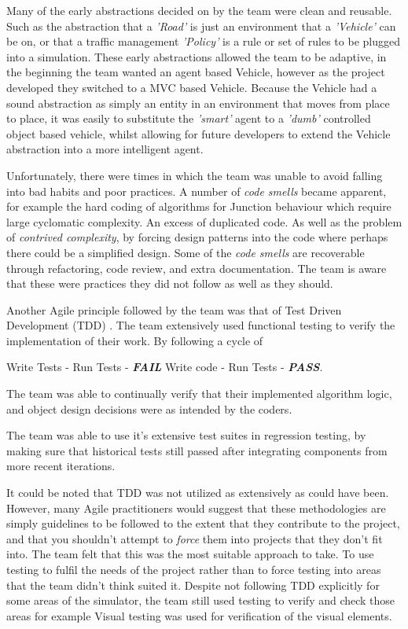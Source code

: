 \documentclass[11pt]{article}
\begin{document}
{\begin{enumerate}
	Many of the early abstractions decided on by the team were clean and reusable. Such as the abstraction that a \textit{'Road'} is just an environment that a \textit{'Vehicle'} can be on, or that a traffic management \textit{'Policy'} is a rule or set of rules to be plugged into a simulation. These early abstractions allowed the team to be adaptive, in the beginning the team wanted an agent based Vehicle, however as the project developed they switched to a MVC based Vehicle. Because the Vehicle had a sound abstraction as simply an entity in an environment that moves from place to place, it was easily to substitute the \textit{'smart'} agent to a \textit{'dumb'} controlled object based vehicle, whilst allowing for future developers to extend the Vehicle abstraction into a more intelligent agent.
	
	Unfortunately, there were times in which the team was unable to avoid falling into bad habits and poor practices. A number of \textit{code smells} became apparent, for example the hard coding of algorithms for Junction behaviour which require large cyclomatic complexity. An excess of duplicated code. As well as the problem of \textit{contrived complexity}, by forcing design patterns into the code where perhaps there could be a simplified design. Some of the \textit{code smells} are recoverable through refactoring, code review, and extra documentation. The team is aware that these were practices they did not follow as well as they should.
	
	Another Agile principle followed by the team was that of Test Driven Development (TDD) \cite{website:Intro-TDD}. The team extensively used functional testing to verify the implementation of their work. By following a cycle of 
	
	Write Tests - Run Tests - \textbf {\textit{FAIL}} \rightarrow Write code - Run Tests - \textbf {\textit{PASS}}. 
	
	The team was able to continually verify that their implemented algorithm logic, and object design decisions were as intended by the coders.
	
	The team was able to use it's extensive test suites in regression testing, by making sure that historical tests still passed after integrating components from more recent iterations.
	
	It could be noted that TDD was not utilized as extensively as could have been. However, many Agile practitioners would suggest that these methodologies are simply guidelines to be followed to the extent that they contribute to the project, and that you shouldn't attempt to \textit{force} them into projects that they don't fit into. The team felt that this was the most suitable approach to take. To use testing to fulfil the needs of the project rather than to force testing into areas that the team didn't think suited it. Despite not following TDD explicitly for some areas of the simulator, the team still used testing to verify and check those areas for example Visual testing was used for verification of the visual elements.
	

\end{enumerate}}
\end{document}
